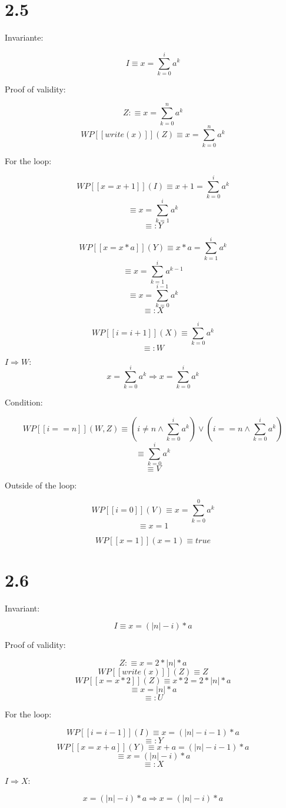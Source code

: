 \documentclass{article}
\begin{document}
\section*{2.5}

Invariante:

$$ I \equiv x=\sum_{k=0}^{i} a^k $$

Proof of validity:

$$ Z:\equiv x=\sum_{k=0}^{n} a^k $$
$$ WP[\![write(x)]\!](Z) \equiv x=\sum_{k=0}^{n} a^k $$

For the loop:

$$ WP[\![x=x+1]\!](I) \equiv x+1=\sum_{k=0}^{i} a^k $$
$$ \equiv x=\sum_{k=1}^{i} a^k $$
$$ \equiv: Y $$

$$ WP[\![x=x*a]\!](Y) \equiv x*a=\sum_{k=1}^{i} a^k $$
$$ \equiv x=\sum_{k=1}^{i} a^{k-1} $$
$$ \equiv x=\sum_{k=0}^{i-1} a^k $$
$$ \equiv: X $$

$$ WP[\![i=i+1]\!](X) \equiv \sum_{k=0}^{i} a^k $$
$$ \equiv: W $$

$ I \Rightarrow W: $
$$ x=\sum_{k=0}^{i} a^k \Rightarrow x=\sum_{k=0}^{i} a^k $$

Condition:

$$ WP[\![i==n]\!](W, Z) \equiv (i \ne n \land \sum_{k=0}^{i} a^k) \lor (i==n \land \sum_{k=0}^{i} a^k) $$
$$ \equiv \sum_{k=0}^{i} a^k $$
$$ \equiv V $$

Outside of the loop:

$$ WP[\![i=0]\!](V) \equiv x=\sum_{k=0}^{0} a^k $$
$$ \equiv x=1 $$

$$ WP[\![x=1]\!](x=1) \equiv true $$

\section*{2.6}

Invariant:

$$ I \equiv x=(|n|-i)*a $$

Proof of validity:

$$ Z:\equiv x=2*|n|*a $$
$$ WP[\![write(x)]\!](Z) \equiv Z $$
$$ WP[\![x=x*2]\!](Z) \equiv x*2=2*|n|*a $$
$$ \equiv x=|n|*a $$
$$ \equiv: U $$

For the loop:

$$ WP[\![i=i-1]\!](I) \equiv x=(|n|-i-1)*a $$
$$ \equiv: Y $$
$$ WP[\![x=x+a]\!](Y) \equiv x+a=(|n|-i-1)*a $$
$$ \equiv x=(|n|-i)*a $$
$$ \equiv: X $$

$ I \Rightarrow X $:

$$ x=(|n|-i)*a \Rightarrow x=(|n|-i)*a $$
\end{document}
